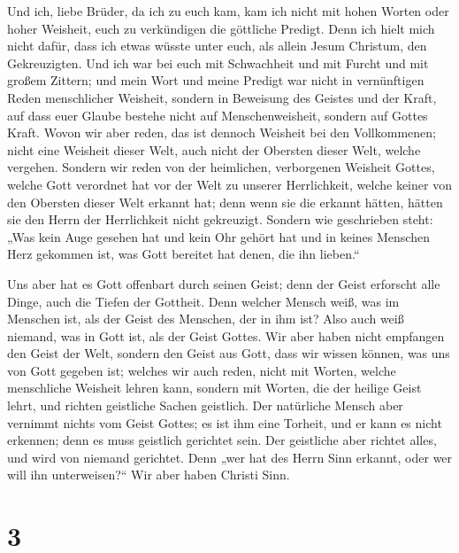  Und ich, liebe Brüder, da ich zu euch kam, kam ich nicht
mit hohen Worten oder hoher Weisheit, euch zu verkündigen die göttliche
Predigt.  Denn ich hielt mich nicht dafür, dass ich etwas
wüsste unter euch, als allein Jesum Christum, den Gekreuzigten.
 Und ich war bei euch mit Schwachheit und mit Furcht und
mit großem Zittern;  und mein Wort und meine Predigt war
nicht in vernünftigen Reden menschlicher Weisheit, sondern in Beweisung
des Geistes und der Kraft,  auf dass euer Glaube bestehe
nicht auf Menschenweisheit, sondern auf Gottes Kraft. 
Wovon wir aber reden, das ist dennoch Weisheit bei den Vollkommenen;
nicht eine Weisheit dieser Welt, auch nicht der Obersten dieser Welt,
welche vergehen.  Sondern wir reden von der heimlichen,
verborgenen Weisheit Gottes, welche Gott verordnet hat vor der Welt zu
unserer Herrlichkeit,  welche keiner von den Obersten
dieser Welt erkannt hat; denn wenn sie die erkannt hätten, hätten sie
den Herrn der Herrlichkeit nicht gekreuzigt.  Sondern wie
geschrieben steht: „Was kein Auge gesehen hat und kein Ohr gehört hat
und in keines Menschen Herz gekommen ist, was Gott bereitet hat denen,
die ihn lieben.``

 Uns aber hat es Gott offenbart durch seinen Geist; denn
der Geist erforscht alle Dinge, auch die Tiefen der Gottheit.
 Denn welcher Mensch weiß, was im Menschen ist, als der
Geist des Menschen, der in ihm ist? Also auch weiß niemand, was in Gott
ist, als der Geist Gottes.  Wir aber haben nicht
empfangen den Geist der Welt, sondern den Geist aus Gott, dass wir
wissen können, was uns von Gott gegeben ist;  welches wir
auch reden, nicht mit Worten, welche menschliche Weisheit lehren kann,
sondern mit Worten, die der heilige Geist lehrt, und richten geistliche
Sachen geistlich.  Der natürliche Mensch aber vernimmt
nichts vom Geist Gottes; es ist ihm eine Torheit, und er kann es nicht
erkennen; denn es muss geistlich gerichtet sein.  Der
geistliche aber richtet alles, und wird von niemand gerichtet.
 Denn „wer hat des Herrn Sinn erkannt, oder wer will ihn
unterweisen?{}`` Wir aber haben Christi Sinn.

\hypertarget{section-2}{%
\section{3}\label{section-2}}


